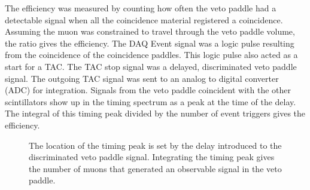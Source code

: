 The efficiency was measured by counting how often the veto paddle had a detectable signal when all the coincidence material registered a coincidence.  Assuming the muon was constrained to travel through the veto paddle volume, the ratio gives the efficiency.  The DAQ Event signal was a logic pulse resulting from the coincidence of the coincidence paddles.  This logic pulse also acted as a start for a TAC.  The TAC stop signal was a delayed, discriminated veto paddle signal.  The outgoing TAC signal was sent to an analog to digital converter (ADC) for integration.  Signals from the veto paddle coincident with the other scintillators show up in the timing spectrum as a peak at the time of the delay.  The integral of this timing peak divided by the number of event triggers gives the efficiency.
\begin{figure}[htp]
\centering
{}
\caption{The location of the timing peak is set by the delay introduced to the discriminated veto paddle signal.  Integrating the timing peak gives the number of muons that generated an observable signal in the veto paddle.}
\label{fig:vetoTestElectronics}
\end{figure}

